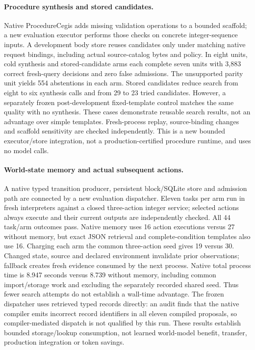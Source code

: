 \paragraph{Procedure synthesis and stored candidates.}
Native ProcedureCegis adds missing validation operations to a bounded scaffold;
a new evaluation executor performs those checks on concrete integer-sequence
inputs. A development body store reuses candidates only under matching native
request bindings, including actual source-catalog bytes and policy. In eight
units, cold synthesis and stored-candidate arms each complete seven units with
3,883 correct fresh-query decisions and zero false admissions. The unsupported
parity unit yields 554 abstentions in each arm. Stored candidates reduce search
from eight to six synthesis calls and from 29 to 23 tried candidates. However,
a separately frozen post-development fixed-template control matches the same
quality with no synthesis. These cases demonstrate reusable search results,
not an advantage over simple templates. Fresh-process replay, source-binding
changes and scaffold sensitivity are checked independently. This is a new
bounded executor/store integration, not a production-certified procedure
runtime, and uses no model calls.

\paragraph{World-state memory and actual subsequent actions.}
A native typed transition producer, persistent block/SQLite store and admission
path are connected by a new evaluation dispatcher. Eleven tasks per arm run in
fresh interpreters against a closed three-action integer service; selected
actions always execute and their current outputs are independently checked.
All 44 task/arm outcomes pass. Native memory uses 16 action executions versus
27 without memory, but exact JSON retrieval and complete-condition templates
also use 16. Charging each arm the common three-action seed gives 19 versus
30. Changed state, source and declared environment invalidate prior observations;
fallback creates fresh evidence consumed by the next process.
Native total process time is 8.947 seconds versus 8.739 without
memory, including common import/storage work and excluding the separately
recorded shared seed. Thus fewer search attempts do not establish a wall-time
advantage. The frozen dispatcher uses retrieved typed records directly: an
audit finds that the native compiler emits incorrect record identifiers in
all eleven compiled proposals, so compiler-mediated dispatch is not qualified
by this run. These results establish bounded storage/lookup consumption, not
learned world-model benefit, transfer, production integration or token savings.

